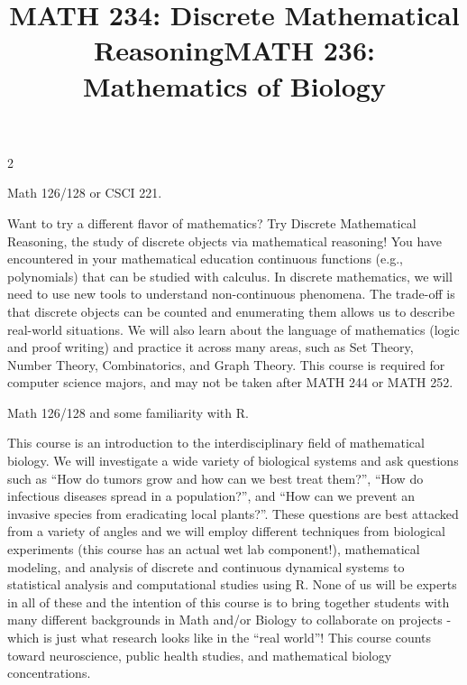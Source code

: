 \documentclass[12pt]{article}
\newcommand{\bolder}{\textbf}
\begin{document}
\begin{multicols}{2}
\begin{tcolorbox}[colback=white, colframe=black]
    \begin{center}
    \title{{\large \bolder{MATH 234: Discrete Mathematical Reasoning}}}
    \end{center}
\end{tcolorbox}

 Math 126/128 or CSCI 221.

Want to try a different flavor of mathematics? Try Discrete Mathematical Reasoning, the study of discrete objects via mathematical reasoning! You have encountered in your mathematical education continuous functions (e.g., polynomials) that can be studied with calculus. In discrete mathematics, we will need to use new tools to understand non-continuous phenomena. The trade-off is that discrete objects can be counted and enumerating them allows us to describe real-world situations. We will also learn about the language of mathematics (logic and proof writing) and practice it across many areas, such as Set Theory, Number Theory, Combinatorics, and Graph Theory. This course is required for computer science majors, and may not be taken after MATH 244 or MATH 252.


\begin{tcolorbox}[colback=white, colframe=black]
    \begin{center}
    \title{{\large \bolder{MATH 236: Mathematics of Biology}}}
    \end{center}
\end{tcolorbox}

 Math 126/128 and some familiarity with R.

This course is an introduction to the interdisciplinary field of mathematical biology. We will investigate a wide variety of biological systems and ask questions such as “How do tumors grow and how can we best treat them?”, “How do infectious diseases spread in a population?”, and “How can we prevent an invasive species from eradicating local plants?”.
These questions are best attacked from a variety of angles and we will employ different techniques from biological experiments (this course has an actual wet lab component!), mathematical modeling, and analysis of discrete and continuous dynamical systems to statistical analysis and computational studies using R. None of us will be experts in all of these and the intention of this course is to bring together students with many different backgrounds in Math and/or Biology to collaborate on projects - which is just what research looks like in the “real world”!  This course counts toward neuroscience, public health studies, and mathematical biology concentrations.



\end{multicols}
\end{document}
